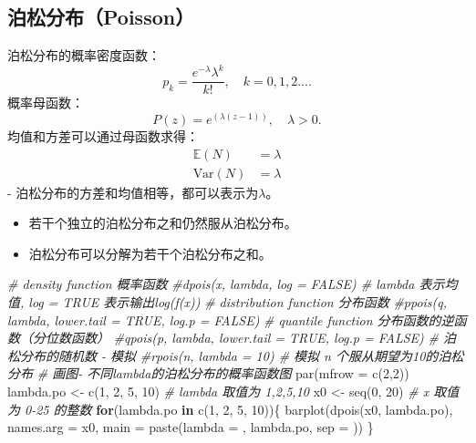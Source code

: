 \documentclass[
]{book}
\newenvironment{Shaded}{\begin{snugshade}}{\end{snugshade}}
\newcommand{\AttributeTok}[1]{\textcolor[rgb]{0.77,0.63,0.00}{#1}}
\newcommand{\CommentTok}[1]{\textcolor[rgb]{0.56,0.35,0.01}{\textit{#1}}}
\newcommand{\ControlFlowTok}[1]{\textcolor[rgb]{0.13,0.29,0.53}{\textbf{#1}}}
\newcommand{\DecValTok}[1]{\textcolor[rgb]{0.00,0.00,0.81}{#1}}
\newcommand{\FunctionTok}[1]{\textcolor[rgb]{0.00,0.00,0.00}{#1}}
\newcommand{\NormalTok}[1]{#1}
\newcommand{\OtherTok}[1]{\textcolor[rgb]{0.56,0.35,0.01}{#1}}
\newcommand{\StringTok}[1]{\textcolor[rgb]{0.31,0.60,0.02}{#1}}
\begin{document}
\hypertarget{ux6ccaux677eux5206ux5e03poisson}{%
\subsection{泊松分布（Poisson）}\label{ux6ccaux677eux5206ux5e03poisson}}

泊松分布的概率密度函数： \[
{{p}_{k}}=\frac{{{e}^{-\lambda }}{{\lambda }^{k}}}{k!},\quad k=0,1,2....
\] 概率母函数：
\[
P(z)=e^{(\lambda(z-1))},\quad \lambda>0.
\]
均值和方差可以通过母函数求得：
\[
\begin{align*}
\mathbb{E}(N)&=\lambda \\
\text{Var}(N)&=\lambda
\end{align*}
\]
- 泊松分布的方差和均值相等，都可以表示为\(\lambda\)。

\begin{itemize}
\item
  若干个独立的泊松分布之和仍然服从泊松分布。
\item
  泊松分布可以分解为若干个泊松分布之和。
\end{itemize}

\begin{Shaded}
\begin{Highlighting}[]
\CommentTok{\# density function 概率函数}
\CommentTok{\#dpois(x, lambda, log = FALSE) \# lambda 表示均值, log = TRUE 表示输出log(f(x))}
\CommentTok{\# distribution function 分布函数}
\CommentTok{\#ppois(q, lambda, lower.tail = TRUE, log.p = FALSE)}
\CommentTok{\# quantile function 分布函数的逆函数（分位数函数）}
\CommentTok{\#qpois(p, lambda, lower.tail = TRUE, log.p = FALSE)}
\CommentTok{\# 泊松分布的随机数 {-} 模拟}
\CommentTok{\#rpois(n, lambda = 10) \# 模拟 n 个服从期望为10的泊松分布}
\CommentTok{\# 画图{-} 不同lambda的泊松分布的概率函数图}
\FunctionTok{par}\NormalTok{(}\AttributeTok{mfrow =} \FunctionTok{c}\NormalTok{(}\DecValTok{2}\NormalTok{,}\DecValTok{2}\NormalTok{))}
\NormalTok{lambda.po }\OtherTok{\textless{}{-}} \FunctionTok{c}\NormalTok{(}\DecValTok{1}\NormalTok{, }\DecValTok{2}\NormalTok{, }\DecValTok{5}\NormalTok{, }\DecValTok{10}\NormalTok{) }\CommentTok{\# lambda 取值为 1,2,5,10}
\NormalTok{x0 }\OtherTok{\textless{}{-}} \FunctionTok{seq}\NormalTok{(}\DecValTok{0}\NormalTok{, }\DecValTok{20}\NormalTok{)            }\CommentTok{\# x 取值为 0{-}25 的整数}
\ControlFlowTok{for}\NormalTok{(lambda.po }\ControlFlowTok{in} \FunctionTok{c}\NormalTok{(}\DecValTok{1}\NormalTok{, }\DecValTok{2}\NormalTok{, }\DecValTok{5}\NormalTok{, }\DecValTok{10}\NormalTok{))\{}
  \FunctionTok{barplot}\NormalTok{(}\FunctionTok{dpois}\NormalTok{(x0, lambda.po), }\AttributeTok{names.arg =}\NormalTok{ x0, }\AttributeTok{main =} \FunctionTok{paste}\NormalTok{(}\StringTok{\textquotesingle{}lambda = \textquotesingle{}}\NormalTok{, lambda.po, }\AttributeTok{sep =} \StringTok{\textquotesingle{}\textquotesingle{}}\NormalTok{))}
\NormalTok{\}}
\end{Highlighting}
\end{Shaded}
\end{document}
